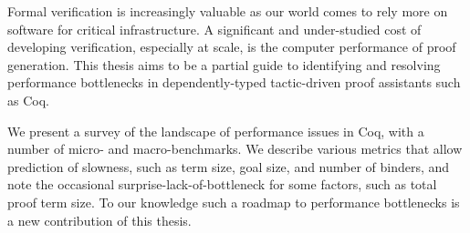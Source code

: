%
%
%
%
%
%
Formal verification is increasingly valuable as our world comes to rely more on software for critical infrastructure.
A significant and under-studied cost of developing verification, especially at scale, is the computer performance of proof generation.
This thesis aims to be a partial guide to identifying and resolving performance bottlenecks in dependently-typed tactic-driven proof assistants such as Coq.

We present a survey of the landscape of performance issues in Coq, with a number of micro- and macro-benchmarks.
We describe various metrics that allow prediction of slowness, such as term size, goal size, and number of binders, and note the occasional surprise-lack-of-bottleneck for some factors, such as total proof term size.
To our knowledge such a roadmap to performance bottlenecks is a new contribution of this thesis.

